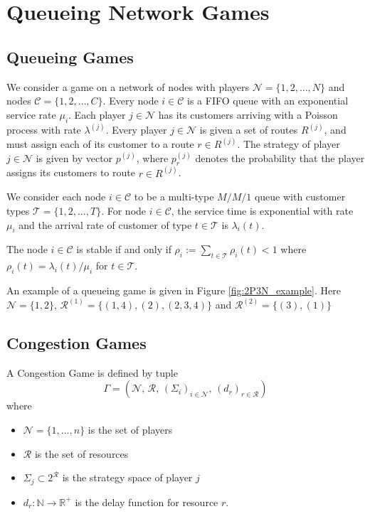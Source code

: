 \chapter{Queueing Network Games} \label{chap2}
\section{Queueing Games}

We consider a game on a network of nodes with players $\mathcal{N} = \{1,2,\ldots,N\}$ and nodes $\mathcal{C} = \{1,2,\ldots,C\}$. Every node $i \in \mathcal{C}$ is a FIFO queue with an exponential service rate $\mu_i$. Each player $j \in \mathcal{N}$ has its customers arriving with a Poisson process with rate $\lambda^{(j)}$. Every player $j \in \mathcal{N}$ is given a set of routes $R^{(j)}$, and must assign each of its customer to a route $r\in R^{(j)}$. The strategy of player $j\in \mathcal{N}$ is given by vector $p^{(j)}$, where $p^{(j)}_r$ denotes the probability that the player assigns its customers to route $r \in R^{(j)}$.

We consider each node $i \in \mathcal{C}$ to be a multi-type $M/M/1$ queue with customer types $\mathcal{T} = \{1, 2, \ldots , T\}$. For node $i\in \mathcal{C}$, the service time is exponential with rate $\mu_i$ and the arrival rate of customer of type $t\in\mathcal{T}$ is $\lambda_i(t)$.

The node $i\in \mathcal{C}$ is stable if and only if $\rho_i := \sum_{t\in\mathcal{T}}\rho_i(t) < 1$ where $\rho_i(t) = \lambda_i(t)/\mu_i$ for $t\in\mathcal{T}$.

\begin{example}
An example of a queueing game is given in Figure \ref{fig:2P3N_example}.
Here
$\mathcal{N} = \{1,2\}$, $\mathcal{R}^{(1)} = \{(1,4),(2),(2,3,4)\}$ and
$\mathcal{R}^{(2)} = \{(3),(1)\}$
\end{example}



\section{Congestion Games}
\begin{definition} A Congestion Game is defined by tuple
\[
\Gamma = \left(\mathcal{N},\,\mathcal{R},\,(\Sigma_i)_{i\in\mathcal{N}},\, (d_r)_{r\in\mathcal{R}} \right)\] where
\begin{itemize}
    \item $\mathcal{N} = \{1,...,n\}$ is the set of players
    \item $\mathcal{R}$ is the set of resources
    \item $\Sigma_j \subset 2^{\mathcal{R}}$ is the strategy space of player $j$
    \item $d_r : \mathbb{N} \rightarrow \mathbb{R}^{+}$ is the delay function for resource $r$.
\end{itemize}
\end{definition}

